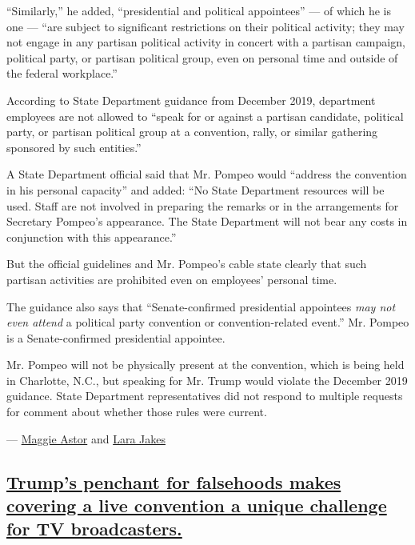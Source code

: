 ``Similarly,'' he added, ``presidential and political appointees'' ---
of which he is one --- ``are subject to significant restrictions on
their political activity; they may not engage in any partisan political
activity in concert with a partisan campaign, political party, or
partisan political group, even on personal time and outside of the
federal workplace.''

According to State Department guidance from December 2019, department
employees are not allowed to ``speak for or against a partisan
candidate, political party, or partisan political group at a convention,
rally, or similar gathering sponsored by such entities.''

A State Department official said that Mr. Pompeo would ``address the
convention in his personal capacity'' and added: ``No State Department
resources will be used. Staff are not involved in preparing the remarks
or in the arrangements for Secretary Pompeo's appearance. The State
Department will not bear any costs in conjunction with this
appearance.''

But the official guidelines and Mr. Pompeo's cable state clearly that
such partisan activities are prohibited even on employees' personal
time.

The guidance also says that ``Senate-confirmed presidential appointees
\emph{may not even attend} a political party convention or
convention-related event.'' Mr. Pompeo is a Senate-confirmed
presidential appointee.

Mr. Pompeo will not be physically present at the convention, which is
being held in Charlotte, N.C., but speaking for Mr. Trump would violate
the December 2019 guidance. State Department representatives did not
respond to multiple requests for comment about whether those rules were
current.

--- \href{https://www.nytimes3xbfgragh.onion/by/maggie-astor}{Maggie
Astor} and \href{https://www.nytimes3xbfgragh.onion/by/lara-jakes}{Lara
Jakes}

\hypertarget{trumps-penchant-for-falsehoods-makes-covering-a-live-convention-a-unique-challenge-for-tv-broadcasters}{%
\subsection{\texorpdfstring{\protect\hyperlink{trumps-penchant-for-falsehoods-makes-covering-a-live-convention-a-unique-challenge-for-tv-broadcasters}{Trump's
penchant for falsehoods makes covering a live convention a unique
challenge for TV
broadcasters.}}{Trump's penchant for falsehoods makes covering a live convention a unique challenge for TV broadcasters.}}\label{trumps-penchant-for-falsehoods-makes-covering-a-live-convention-a-unique-challenge-for-tv-broadcasters}}

